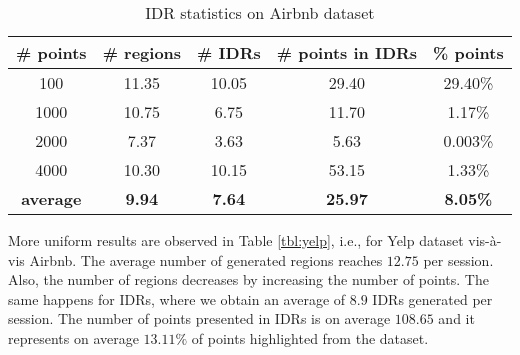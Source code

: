 \documentclass[sigconf,edbt]{acmart-edbt2019}
\begin{document}
\begin{table}[h]
\centering
\caption{IDR statistics on \textsf{Airbnb} dataset}
\label{tbl:airbnb}
\begin{tabular}{|c|c|c|c|c|}
\cline{1-5}
\textbf{\# points}  & \textbf{\# regions} 	& \textbf{\# IDRs} 	& \textbf{\# points in IDRs}	& \textbf{\%  points}	\\ \hline
\multicolumn{1}{|c|}{100} 				& 11.35            	& 10.05	          	& 29.40             & 29.40\%            
 \\ \hline
\multicolumn{1}{|c|}{1000} 				& 10.75          	& 6.75	          	& 11.70              & 1.17\%              \\ \hline
\multicolumn{1}{|c|}{2000} 				& 7.37           	& 3.63         	& 5.63             & 0.003\%              \\ \hline
\multicolumn{1}{|c|}{4000} 				& 10.30           	& 10.15	          	& 53.15              & 1.33\%              \\ \hline
\multicolumn{1}{|c|}{\textbf{average}} 				& \textbf{9.94}           	& \textbf{7.64}	          	&\textbf{ 25.97}              & \textbf{8.05\% }             \\ \hline

\end{tabular}
\end{table}

\vspace{2pt}
More uniform results are observed in Table \ref{tbl:yelp}, i.e., for \textsf{Yelp} dataset vis-\`a-vis \textsf{Airbnb}. The average number of generated regions reaches $12.75$ per session. Also, the number of regions decreases by increasing the number of points. The same happens for IDRs, where we obtain an average of $8.9$ IDRs generated per session. The number of points presented in IDRs is on average $108.65$ and it represents on average $13.11\%$ of points highlighted from the dataset.

\end{document}
